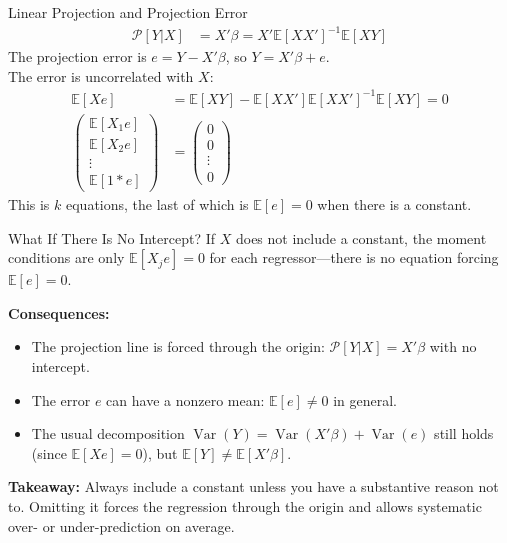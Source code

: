 \documentclass[aspectratio=169, handout, t]{beamer}
\numberwithin{equation}{section}
\begin{document}
\begin{frame}{Linear Projection and Projection Error}
\begin{align*}
\mathcal{P}[Y|X]&=X'\beta=X'\mathbb{E}[XX']^{-1}\mathbb{E}[XY]
\end{align*}\pause
The projection error is $e=Y-X'\beta$, so $Y=X'\beta+e$.\\
\medskip
The error is uncorrelated with $X$:
\begin{align*}
\mathbb{E}[Xe]&=\mathbb{E}[XY]-\mathbb{E}[XX']\mathbb{E}[XX']^{-1}\mathbb{E}[XY]=0\\
\begin{pmatrix}\mathbb{E}[X_1e]\\\mathbb{E}[X_2e] \\ \vdots \\\mathbb{E}[1*e] \end{pmatrix}&=\begin{pmatrix}0\\0\\ \vdots \\ 0\end{pmatrix}
\end{align*}
This is $k$ equations, the last of which is $\mathbb{E}[e]=0$ when there is a constant.
\end{frame}

\begin{frame}{What If There Is No Intercept?}
If $X$ does not include a constant, the moment conditions are only $\mathbb{E}[X_j e]=0$ for each regressor---there is no equation forcing $\mathbb{E}[e]=0$.
\pause

\medskip
\textbf{Consequences:}
\begin{itemize}
\item The projection line is forced through the origin: $\mathcal{P}[Y|X]=X'\beta$ with no intercept.
\item The error $e$ can have a nonzero mean: $\mathbb{E}[e]\neq 0$ in general.
\pause
\item The usual decomposition $\operatorname{Var}(Y)=\operatorname{Var}(X'\beta)+\operatorname{Var}(e)$ still holds (since $\mathbb{E}[Xe]=0$), but $\mathbb{E}[Y]\neq \mathbb{E}[X'\beta]$.
\end{itemize}
\pause
\medskip
\textbf{Takeaway:} Always include a constant unless you have a substantive reason not to.  Omitting it forces the regression through the origin and allows systematic over- or under-prediction on average.
\end{frame}
\end{document}
